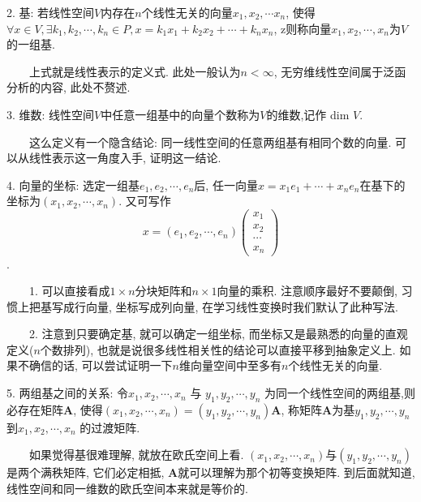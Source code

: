 2. 基: 若线性空间$V$内存在$n$个线性无关的向量$x_1,x_2,\cdots x_n$, 使得$\forall x \in V, \exists k_1,k_2,\cdots,k_n \in P, x=k_1x_1+k_2x_2+\cdots+k_nx_n$, 
z则称向量$x_1,x_2,\cdots,x_n$为$V$的一组基.

\begin{tcolorbox}[colback=gray!5,colframe=orange!75!black,title=注意事项]
    ~~~~上式就是线性表示的定义式. 此处一般认为$n<\infty$, 无穷维线性空间属于泛函分析的内容, 此处不赘述.
  \end{tcolorbox}
  
3. 维数: 线性空间$V$中任意一组基中的向量个数称为$V$的维数,记作 dim $V$. 

\begin{tcolorbox}[colback=blue!5,colframe=blue!75!black,title=定义解析]
    ~~~~这么定义有一个隐含结论: 同一线性空间的任意两组基有相同个数的向量. 可以从线性表示这一角度入手, 证明这一结论.
\end{tcolorbox}

4. 向量的坐标: 选定一组基$e_1,e_2,\cdots,e_n$后, 任一向量$x=x_1e_1+\cdots+x_ne_n$在基下的坐标为$(x_1,x_2,\cdots,x_n)$.
又可写作
\begin{equation*}
    x=(e_1,e_2,\cdots,e_n)\begin{pmatrix}
        x_1 \\
        x_2\\
        \cdots\\
        x_n
    \end{pmatrix}
\end{equation*}.

\begin{tcolorbox}[colback=gray!5,colframe=orange!75!black,title=注意事项]
    ~~~~1. 可以直接看成$1\times n$分块矩阵和$n \times 1$向量的乘积. 注意顺序最好不要颠倒, 习惯上把基写成行向量, 坐标写成列向量, 
    在学习线性变换时我们默认了此种写法.
    
    ~~~~2. 注意到只要确定基, 就可以确定一组坐标, 而坐标又是最熟悉的向量的直观定义($n$个数排列), 也就是说很多线性相关性的结论可以直接平移到抽象定义上. 
    如果不确信的话, 可以尝试证明一下$n$维向量空间中至多有$n$个线性无关的向量.
  \end{tcolorbox}

5. 两组基之间的关系: 令$x_1,x_2,\cdots,x_n$ 与 $y_1,y_2,\cdots,y_n$ 为同一个线性空间的两组基,则必存在矩阵\textbf{A}, 
使得$(x_1,x_2,\cdots,x_n)=(y_1,y_2,\cdots,y_n)\textbf{A}$, 称矩阵\textbf{A}为基$y_1,y_2,\cdots,y_n$到$x_1,x_2,\cdots,x_n$ 的过渡矩阵.

\begin{tcolorbox}[colback=yellow!10,colframe=red!75!black,title=小窍门]
    ~~~~如果觉得基很难理解, 就放在欧氏空间上看. $(x_1,x_2,\cdots,x_n)$与$(y_1,y_2,\cdots,y_n)$是两个满秩矩阵, 它们必定相抵, \textbf{A}就可以理解为那个初等变换矩阵. 
    到后面就知道, 线性空间和同一维数的欧氏空间本来就是等价的.
\end{tcolorbox}


